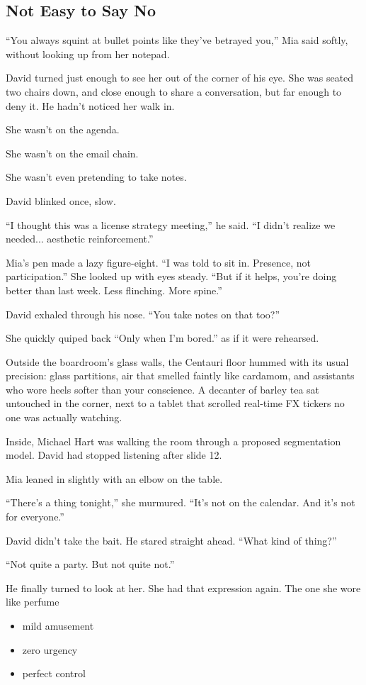 \subsection{Not Easy to Say No}

``You always squint at bullet points like they’ve betrayed you,'' Mia said softly, without looking up from her notepad.

David turned just enough to see her out of the corner of his eye. She was seated two chairs down, and close 
enough to share a conversation, but far enough to deny it. He hadn’t noticed her walk in.

She wasn’t on the agenda.

She wasn’t on the email chain.

She wasn’t even pretending to take notes.

David blinked once, slow.

``I thought this was a license strategy meeting,'' he said. ``I didn’t realize we needed... aesthetic reinforcement.''

Mia’s pen made a lazy figure-eight. ``I was told to sit in. Presence, not participation.'' She looked up  
with eyes steady. ``But if it helps, you’re doing better than last week. Less flinching. More spine.''

David exhaled through his nose. ``You take notes on that too?''

She quickly quiped back ``Only when I’m bored.'' as if it were rehearsed.

Outside the boardroom’s glass walls, the Centauri floor hummed with its usual precision: glass partitions, air 
that smelled faintly like cardamom, and assistants who wore heels softer than your conscience. A decanter of barley 
tea sat untouched in the corner, next to a tablet that scrolled real-time FX tickers no one was actually watching.

Inside, Michael Hart was walking the room through a proposed segmentation model. David had stopped listening 
after slide 12.

Mia leaned in slightly with an elbow on the table.

``There’s a thing tonight,'' she murmured. ``It's not on the calendar. And it's not for everyone.''

David didn’t take the bait. He stared straight ahead. ``What kind of thing?''

``Not quite a party. But not quite not.''

He finally turned to look at her. She had that expression again. The one she wore like perfume
\begin{itemize}
    \item mild amusement
    \item zero urgency
    \item perfect control
\end{itemize}

